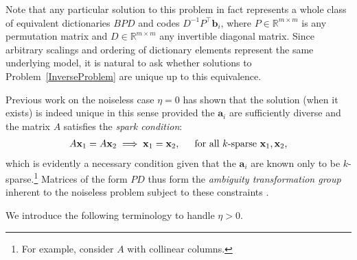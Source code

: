 \documentclass[journal, twocolumn]{IEEEtran}
\begin{document}
Note that any particular solution to this problem in fact represents a whole class of equivalent dictionaries $BPD$ and codes $D^{-1}P^{\top}\mathbf{b}_i$, where $P \in \mathbb{R}^{m \times m}$ is any permutation matrix and $D \in \mathbb{R}^{m \times m}$ any invertible diagonal matrix. Since  arbitrary scalings and ordering of dictionary elements represent the same underlying model, it is natural to ask whether solutions to Problem~\ref{InverseProblem} are unique up to this equivalence.

Previous work \cite{li2004analysis, Georgiev05, Aharon06, Hillar15} on the noiseless case $\eta = 0$ has shown that the solution (when it exists) is indeed unique in this sense provided the $\mathbf{a}_i$ are sufficiently diverse and the matrix $A$ satisfies the \textit{spark condition}:
\begin{align}\label{SparkCondition}
A\mathbf{x}_1 = A\mathbf{x}_2 \implies \mathbf{x}_1 = \mathbf{x}_2,\indent \text{for all $k$-sparse } \mathbf{x}_1, \mathbf{x}_2,
\end{align}
%
which is evidently a necessary condition given that the $\mathbf{a}_i$ are known only to be $k$-sparse.\footnote{For example, consider $A$ with collinear columns.} 
Matrices of the form $PD$ thus form the \emph{ambiguity transformation group} inherent to the noiseless problem subject to these constraints \cite{Li15}. 

We introduce the following terminology to handle $\eta > 0$.

\end{document}
